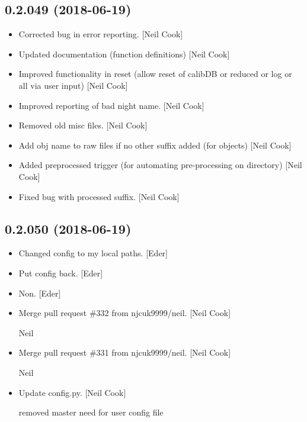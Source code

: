 \documentclass[a4paper,10pt,english]{report}
\begin{document}
\subsection{0.2.049 (2018-06-19)}
\label{\detokenize{misc/changelog:id415}}\begin{itemize}
\item {} 
Corrected bug in  error reporting. {[}Neil Cook{]}

\item {} 
Updated documentation (function definitions) {[}Neil Cook{]}

\item {} 
Improved functionality in reset (allow reset of calibDB or reduced or
log or all via user input) {[}Neil Cook{]}

\item {} 
Improved reporting of bad night name. {[}Neil Cook{]}

\item {} 
Removed old misc files. {[}Neil Cook{]}

\item {} 
Add obj name to raw files if no other suffix added (for objects) {[}Neil
Cook{]}

\item {} 
Added preprocessed trigger (for automating pre-processing on
 directory) {[}Neil Cook{]}

\item {} 
Fixed bug with processed suffix. {[}Neil Cook{]}

\end{itemize}


\subsection{0.2.050 (2018-06-19)}
\label{\detokenize{misc/changelog:id416}}\begin{itemize}
\item {} 
Changed config to my local paths. {[}Eder{]}

\item {} 
Put config back. {[}Eder{]}

\item {} 
Non. {[}Eder{]}

\item {} 
Merge pull request \#332 from njcuk9999/neil. {[}Neil Cook{]}

Neil

\item {} 
Merge pull request \#331 from njcuk9999/neil. {[}Neil Cook{]}

Neil

\item {} 
Update config.py. {[}Neil Cook{]}

removed master need for user config file

\end{itemize}
\end{document}
